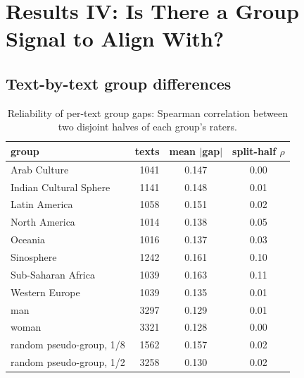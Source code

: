 \section{Results IV: Is There a Group Signal to Align With?}
\label{sec:groupsignal}

\subsection{Text-by-text group differences}
\label{sec:groupsignal:items}

\begin{table}[t]
  \centering
  \caption{Reliability of per-text group gaps: Spearman correlation between two disjoint halves
    of each group's raters.}
  \label{tab:reliability}
  \begin{tabular}{lrcc}
    \toprule
    group & texts & mean $|$gap$|$ & split-half $\rho$ \\
    \midrule
    Arab Culture           & \num{1041} & 0.147 & 0.00 \\
    Indian Cultural Sphere & \num{1141} & 0.148 & 0.01 \\
    Latin America          & \num{1058} & 0.151 & 0.02 \\
    North America          & \num{1014} & 0.138 & 0.05 \\
    Oceania                & \num{1016} & 0.137 & 0.03 \\
    Sinosphere             & \num{1242} & 0.161 & 0.10 \\
    Sub-Saharan Africa     & \num{1039} & 0.163 & 0.11 \\
    Western Europe         & \num{1039} & 0.135 & 0.01 \\
    man                    & \num{3297} & 0.129 & 0.01 \\
    woman                  & \num{3321} & 0.128 & 0.00 \\
    \midrule
    random pseudo-group, 1/8 & \num{1562} & 0.157 & 0.02 \\
    random pseudo-group, 1/2 & \num{3258} & 0.130 & 0.02 \\
    \bottomrule
  \end{tabular}
\end{table}


